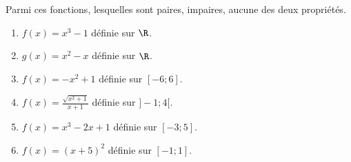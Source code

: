 
Parmi ces fonctions, lesquelles sont paires, impaires, aucune des deux propriétés.
\begin{enumerate}
\item $f(x)=x^3-1$ définie sur $\R$.
\item $g(x)=x^2-x$ définie sur $\R$.
\item $f(x)=-x^2+1$ définie sur $[-6;6]$.
\item $f(x)=\frac{\sqrt{x^2+1}}{x+1}$ définie sur $]-1;4[$.
\item $f(x)=x^3-2x+1$ définie sur $[-3;5]$.
\item $f(x)=(x+5)^2$ définie sur $[-1;1]$.
\end{enumerate}